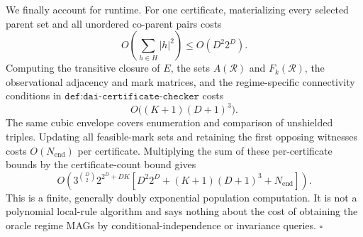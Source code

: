 We finally account for runtime.  For one certificate, materializing every selected parent set and all unordered co-parent pairs costs
\[
O\!\left(\sum_{h\in H}|h|^2\right)
\le O(D^2 2^D).
\]
Computing the transitive closure of \(E\), the sets \(A(\mathcal R)\) and \(F_k(\mathcal R)\), the observational adjacency and mark matrices, and the regime-specific connectivity conditions in \(\texttt{def:dai-certificate-checker}\) costs
\[
O\bigl((K+1)(D+1)^3\bigr).
\]
The same cubic envelope covers enumeration and comparison of unshielded triples.  Updating all feasible-mark sets and retaining the first opposing witnesses costs \(O(N_{\mathrm{end}})\) per certificate.  Multiplying the sum of these per-certificate bounds by the certificate-count bound gives
\[
O\!\left(
3^{\binom D2}2^{2^D+DK}
\left[D^2 2^D+(K+1)(D+1)^3+N_{\mathrm{end}}\right]
\right).
\]
This is a finite, generally doubly exponential population computation.  It is not a polynomial local-rule algorithm and says nothing about the cost of obtaining the oracle regime MAGs by conditional-independence or invariance queries. \(\square\)